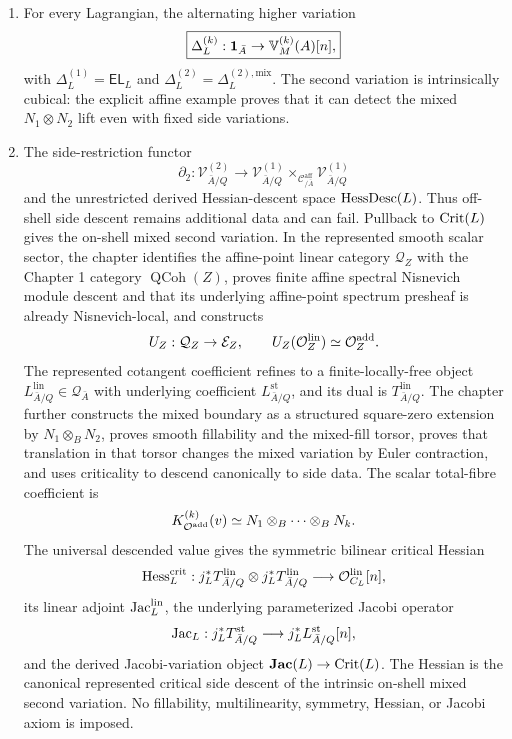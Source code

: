 \begin{theorem}
\begin{enumerate}
\item For every Lagrangian, the alternating higher variation
\[
    \boxed{
    \Delta_L^{(k)}:
    \mathbf 1_{\bar A}\to\mathbb V_M^{(k)}(A)[n],
    }
\]
with \(\Delta_L^{(1)}=\mathsf{EL}_L\) and \(\Delta_L^{(2)}=\Delta_L^{(2),\mathrm{mix}}\). The second variation is intrinsically cubical: the explicit affine example proves that it can detect the mixed \(N_1\otimes N_2\) lift even with fixed side variations.

\item The side-restriction functor
\[
    \partial_2:\mathcal V^{(2)}_{\bar A/Q}
    \to
    \mathcal V^{(1)}_{\bar A/Q}
    \times_{\mathcal C^{\mathrm{aff}}_{/\bar A}}
    \mathcal V^{(1)}_{\bar A/Q}
\]
and the unrestricted derived Hessian-descent space \(\operatorname{HessDesc}(L)\). Thus off-shell side descent remains additional data and can fail. Pullback to \(\operatorname{Crit}(L)\) gives the on-shell mixed second variation. In the represented smooth scalar sector, the chapter identifies the affine-point linear category \(\mathcal Q_Z\) with the Chapter 1 category \(\operatorname{QCoh}(Z)\), proves finite affine spectral Nisnevich module descent and that its underlying affine-point spectrum presheaf is already Nisnevich-local, and constructs
\[
    U_Z:\mathcal Q_Z\to\mathcal E_Z,
    \qquad
    U_Z(\mathcal O_Z^{\mathrm{lin}})\simeq\mathcal O^{\mathrm{add}}_Z.
\]
The represented cotangent coefficient refines to a finite-locally-free object \(L^{\mathrm{lin}}_{\bar A/Q}\in\mathcal Q_{\bar A}\) with underlying coefficient \(L^{\mathrm{st}}_{\bar A/Q}\), and its dual is \(T^{\mathrm{lin}}_{\bar A/Q}\).  The chapter further constructs the mixed boundary as a structured square-zero extension by \(N_1\otimes_BN_2\), proves smooth fillability and the mixed-fill torsor, proves that translation in that torsor changes the mixed variation by Euler contraction, and uses criticality to descend canonically to side data. The scalar total-fibre coefficient is
\[
    K_{\mathcal O^{\mathrm{add}}}^{(k)}(v)
    \simeq
    N_1\otimes_B\cdots\otimes_BN_k.
\]
The universal descended value gives the symmetric bilinear critical Hessian
\[
    \operatorname{Hess}_L^{\mathrm{crit}}:
    j_L^*T^{\mathrm{lin}}_{\bar A/Q}
    \otimes
    j_L^*T^{\mathrm{lin}}_{\bar A/Q}
    \longrightarrow
    \mathcal O_{C_L}^{\mathrm{lin}}[n],
\]
its linear adjoint \(\operatorname{Jac}_L^{\mathrm{lin}}\), the underlying parameterized Jacobi operator
\[
    \operatorname{Jac}_L:
    j_L^*T^{\mathrm{st}}_{\bar A/Q}
    \longrightarrow
    j_L^*L^{\mathrm{st}}_{\bar A/Q}[n],
\]
and the derived Jacobi-variation object \(\mathbf{Jac}(L)\to\operatorname{Crit}(L)\).  The Hessian is the canonical represented critical side descent of the intrinsic on-shell mixed second variation.  No fillability, multilinearity, symmetry, Hessian, or Jacobi axiom is imposed.


\end{enumerate}
\end{theorem}
